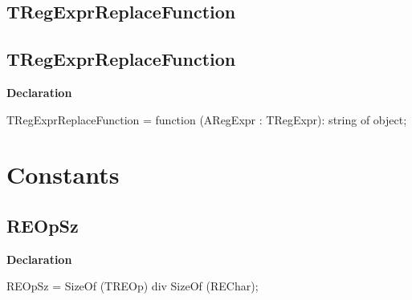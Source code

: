 \documentclass{report}
\newif\ifpdf
\begin{document}
\subsection*{\large{\textbf{TRegExprReplaceFunction}}\normalsize\hspace{1ex}\hrulefill}
\else
\subsection*{TRegExprReplaceFunction}
\fi
\label{RegExpr-TRegExprReplaceFunction}
\begin{list}{}{
\setlength{\itemindent}{0cm}
\setlength{\listparindent}{0cm}
\setlength{\leftmargin}{\evensidemargin}
\addtolength{\leftmargin}{\tmplength}
\settowidth{\labelsep}{X}
\addtolength{\leftmargin}{\labelsep}
\setlength{\labelwidth}{\tmplength}
}
\item[\textbf{Declaration}\hfill]
\ifpdf
\begin{flushleft}
\fi
\begin{ttfamily}
TRegExprReplaceFunction = function (ARegExpr : TRegExpr): string of object;\end{ttfamily}

\ifpdf
\end{flushleft}
\fi

\end{list}
\section{Constants}
\ifpdf
\subsection*{\large{\textbf{REOpSz}}\normalsize\hspace{1ex}\hrulefill}
\else
\subsection*{REOpSz}
\fi
\label{RegExpr-REOpSz}
\begin{list}{}{
\setlength{\itemindent}{0cm}
\setlength{\listparindent}{0cm}
\setlength{\leftmargin}{\evensidemargin}
\addtolength{\leftmargin}{\tmplength}
\settowidth{\labelsep}{X}
\addtolength{\leftmargin}{\labelsep}
\setlength{\labelwidth}{\tmplength}
}
\item[\textbf{Declaration}\hfill]
\ifpdf
\begin{flushleft}
\fi
\begin{ttfamily}
REOpSz = SizeOf (TREOp) div SizeOf (REChar);\end{ttfamily}

\ifpdf
\end{flushleft}
\fi

\end{list}
\ifpdf
\end{document}
